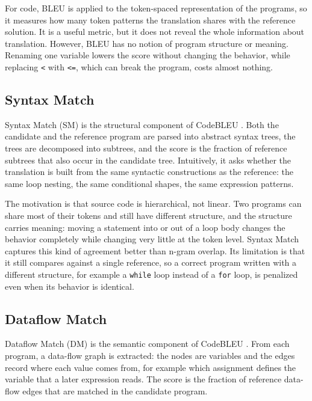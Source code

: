 For code, BLEU is applied to the token-spaced representation of the programs,
so it measures how many token patterns the translation shares with the
reference solution. It is a useful metric, but it does not reveal the whole information about translation. 
However, BLEU has no notion
of program structure or meaning. Renaming one variable lowers the score
without changing the behavior, while replacing \texttt{<} with \texttt{<=},
which can break the program, costs almost nothing.

\subsection{Syntax Match}

\quad Syntax Match (SM) is the structural component of CodeBLEU
\cite{ren2020codebleu}. Both the candidate and the reference program are
parsed into abstract syntax trees, the trees are decomposed into subtrees, and
the score is the fraction of reference subtrees that also occur in the
candidate tree. Intuitively, it asks whether the translation is built from the
same syntactic constructions as the reference: the same loop nesting, the same
conditional shapes, the same expression patterns.

The motivation is that source code is hierarchical, not linear. Two programs
can share most of their tokens and still have different structure, and the
structure carries meaning: moving a statement into or out of a loop body
changes the behavior completely while changing very little at the token level.
Syntax Match captures this kind of agreement better than n-gram overlap. Its
limitation is that it still compares against a single reference, so a correct
program written with a different structure, for example a \texttt{while} loop
instead of a \texttt{for} loop, is penalized even when its behavior is
identical.

\subsection{Dataflow Match}

\quad Dataflow Match (DM) is the semantic component of CodeBLEU
\cite{ren2020codebleu}. From each program, a data-flow graph is extracted: the
nodes are variables and the edges record where each value comes from, for
example which assignment defines the variable that a later expression reads.
The score is the fraction of reference data-flow edges that are matched in the
candidate program.

